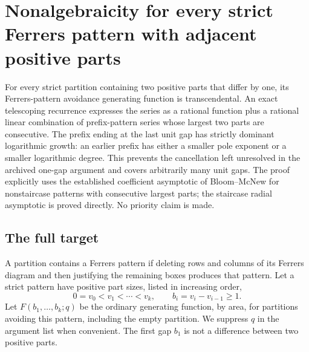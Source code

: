 \documentclass[11pt,a4paper]{article}
\numberwithin{equation}{section}
\theoremstyle{definition}
\theoremstyle{remark}
\newenvironment{sectionabstract}{\par\smallskip\begingroup\small\noindent}{\par\endgroup\medskip}
\begin{document}
\par\endgroup

\begingroup

\clearpage
\section{\texorpdfstring{Nonalgebraicity for every strict Ferrers pattern with adjacent positive parts}{Nonalgebraicity for every strict Ferrers pattern with adjacent positive parts}}\label{section:add47taisho}
\par\medskip


\begin{sectionabstract}
For every strict partition containing two positive parts that differ by
one, its Ferrers-pattern avoidance generating function is transcendental.
An exact telescoping recurrence expresses the series as a rational
function plus a rational linear combination of prefix-pattern series
whose largest two parts are consecutive.  The prefix ending at the last
unit gap has strictly dominant logarithmic growth: an earlier prefix
has either a smaller pole exponent or a smaller logarithmic degree.
This prevents the cancellation left unresolved in the archived one-gap
argument and covers arbitrarily many unit gaps.  The proof explicitly
uses the established coefficient asymptotic of Bloom--McNew for
nonstaircase patterns with consecutive largest parts; the staircase
radial asymptotic is proved directly.  No priority claim is made.
\end{sectionabstract}

\subsection{The full target}
A partition contains a Ferrers pattern if deleting rows and columns of
its Ferrers diagram and then justifying the remaining boxes produces
that pattern.  Let a strict pattern have positive part sizes, listed in
increasing order,
\[
 0=v_0<v_1<\cdots<v_k,\qquad b_i=v_i-v_{i-1}\ge1.
\]
Let $F(b_1,\ldots,b_k;q)$ be the ordinary generating function, by area,
for partitions avoiding this pattern, including the empty partition.
We suppress $q$ in the argument list when convenient.  The first gap
$b_1$ is not a difference between two positive parts.
\end{document}
